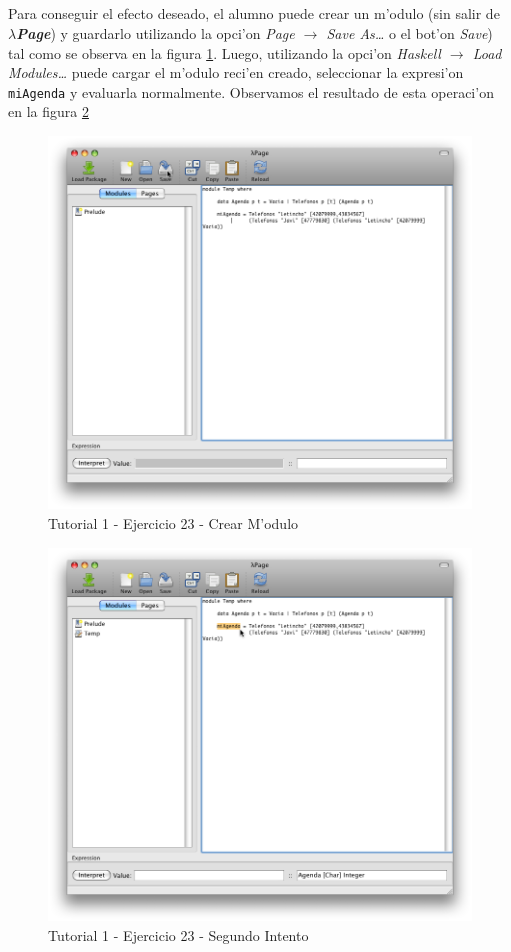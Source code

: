 \documentclass[a4paper]{article}
\newcommand{\hpage}{\textbf{\textsl{$\lambda$Page}}}
\begin{document}
\subparagraph{}Para conseguir el efecto deseado, el alumno puede crear un m'odulo (sin salir de \hpage) y guardarlo utilizando la opci'on \textsl{Page $\rightarrow$ Save As\ldots} o el bot'on \textsl{Save}) tal como se observa en la figura \ref{tut110}.  Luego, utilizando la opci'on \textsl{Haskell $\rightarrow$ Load Modules\ldots} puede cargar el m'odulo reci'en creado, seleccionar la expresi'on \texttt{miAgenda} y evaluarla normalmente.  Observamos el resultado de esta operaci'on en la figura \ref{tut111}
\begin{figure}[hp]
	\begin{center}
        	\includegraphics[width=.75\textwidth]{pictures/tut1/10}
		\caption{Tutorial 1 - Ejercicio 23 - Crear M'odulo}
		\label{tut110}
	\end{center}
\end{figure}
\begin{figure}[hp]
	\begin{center}
        	\includegraphics[width=.75\textwidth]{pictures/tut1/11}
		\caption{Tutorial 1 - Ejercicio 23 - Segundo Intento}
		\label{tut111}
	\end{center}
\end{figure}
\end{document}

